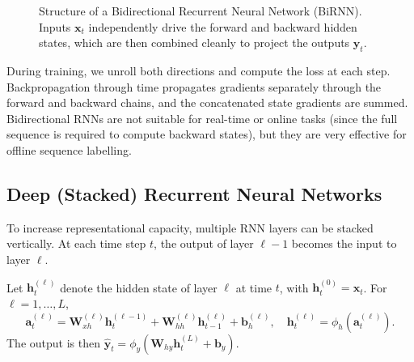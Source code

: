 \documentclass{tufte-handout}
\begin{document}
\begin{figure}[h]
\caption{Structure of a Bidirectional Recurrent Neural Network (BiRNN). Inputs $\mathbf{x}_t$ independently drive the forward and backward hidden states, which are then combined cleanly to project the outputs $\mathbf{y}_t$.}
\label{fig:birnn_structure_standard}
\end{figure}

During training, we unroll both directions and compute the loss at each step. Backpropagation through time propagates gradients separately through the forward and backward chains, and the concatenated state gradients are summed. Bidirectional RNNs are not suitable for real-time or online tasks (since the full sequence is required to compute backward states), but they are very effective for offline sequence labelling.

\subsection{Deep (Stacked) Recurrent Neural Networks}

To increase representational capacity, multiple RNN layers can be stacked vertically. At each time step $t$, the output of layer $\ell-1$ becomes the input to layer $\ell$.

\begin{defn}
    Let $\mathbf{h}_t^{(\ell)}$ denote the hidden state of layer $\ell$ at time $t$, with $\mathbf{h}_t^{(0)} = \mathbf{x}_t$. For $\ell = 1,\dots,L$,
    \[
    \mathbf{a}_t^{(\ell)} = \mathbf{W}_{xh}^{(\ell)} \mathbf{h}_t^{(\ell-1)} + \mathbf{W}_{hh}^{(\ell)} \mathbf{h}_{t-1}^{(\ell)} + \mathbf{b}_h^{(\ell)},\quad
    \mathbf{h}_t^{(\ell)} = \phi_h(\mathbf{a}_t^{(\ell)}).
    \]
    The output is then $\hat{\mathbf{y}}_t = \phi_y(\mathbf{W}_{hy} \mathbf{h}_t^{(L)} + \mathbf{b}_y)$.
\end{defn}
\end{document}
